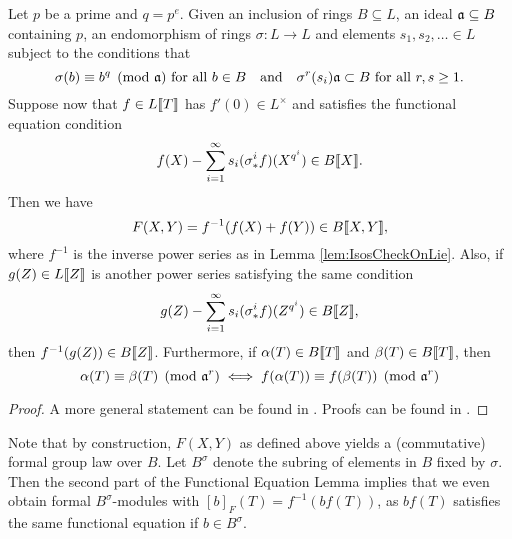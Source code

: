 \documentclass[../main.tex]{subfiles}
\begin{document}
\begin{prop} 
  Let $p$ be a prime and $q = p^e$. Given an inclusion of rings $B \subseteq
  L$, an ideal $\mathfrak{a} \subseteq B$ containing $p$, an endomorphism of rings
  $\sigma: L \to L$ and elements $s_1, s_2, \dots \in L$ subject to the conditions
  that 
  \begin{equation*}
    \sigma(b) \equiv b^q \pmod {\mathfrak{a}} \text{ for all } b \in B \quad \text{and} \quad 
    \sigma^r(s_i) \mathfrak{a} \subset B \text{ for all } r,s \geq 1.
  \end{equation*}
  Suppose now that $f \in L\llbracket T \rrbracket$ has $f'(0) \in L^\times$ and
  satisfies the functional equation condition
  \begin{equation*}
    f(X) - \sum_{i=1}^\infty s_i (\sigma^i_* f)(X^{q^i}) \in B\llbracket X \rrbracket.
  \end{equation*}
  Then we have 
  \begin{equation*}
    F(X,Y) = f^{-1}(f(X) + f(Y)) \in B \llbracket X,Y \rrbracket,
  \end{equation*}
  where $f^{-1}$ is the inverse power series as in Lemma \ref{lem:IsosCheckOnLie}.
  Also, if $g(Z) \in L\llbracket Z \rrbracket$ is another power series satisfying the 
  same condition
  \begin{equation*}
    g(Z) - \sum_{i=1}^\infty s_i (\sigma^i_* f)(Z^{q^i}) \in B\llbracket Z \rrbracket,
  \end{equation*}
  then $f^{-1}(g(Z)) \in B\llbracket Z \rrbracket$. 
  Furthermore, if $\alpha(T) \in B\llbracket T \rrbracket$ and $\beta(T) \in B \llbracket T \rrbracket$, then
  \begin{equation} \label{eq:funceqlemcongruence}
    \alpha(T) \equiv \beta(T) \pmod {\mathfrak{a}^r} \iff f(\alpha(T)) \equiv f(\beta(T))
    \pmod {\mathfrak{a}^r}
  \end{equation}

  \begin{proof}
    A more general statement can be found in \cite[Section
    2]{hazewinkel1979funceqexp}. Proofs can be found in \cite[Sections 2 and
    10]{hazewinkel1978formal}.
  \end{proof}
\end{prop}
Note that by construction, $F(X,Y)$ as defined above yields a (commutative)
formal group law over $B$. 
Let $B^\sigma$ denote the subring of elements in $B$ fixed by $\sigma$. Then 
the second part of the Functional Equation Lemma implies that we even obtain
formal $B^\sigma$-modules with $[b]_F(T) = f^{-1}(b f(T))$, as $bf(T)$
satisfies the same functional equation if $b \in B^\sigma$. 
\end{document}
